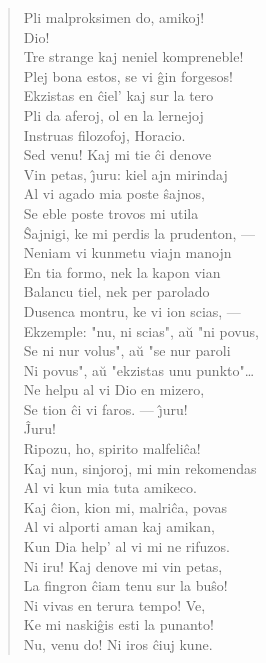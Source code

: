 \begin{verse}
                Pli malproksimen do, amikoj!\\
  Dio!\\
                Tre strange kaj neniel kompreneble!\\
 Plej bona estos, se vi \^gin forgesos!\\
                Ekzistas en \^ciel' kaj sur la tero\\
                Pli da aferoj, ol en la lernejoj\\
                Instruas filozofoj, Horacio.\\
                Sed venu! Kaj mi tie \^ci denove\\
                Vin petas, \^{\j}uru: kiel ajn mirindaj\\
                Al vi agado mia poste \^sajnos,\\
                Se eble poste trovos mi utila\\
                \^Sajnigi, ke mi perdis la prudenton, ---\\
                Neniam vi kunmetu viajn manojn\\
                En tia formo, nek la kapon vian\\
                Balancu tiel, nek per parolado\\
                Dusenca montru, ke vi ion scias, ---\\
                Ekzemple: "nu, ni scias", a\u u "ni povus,\\
                Se ni nur volus", a\u u "se nur paroli\\
                Ni povus", a\u u "ekzistas unu punkto"\dots\\
                Ne helpu al vi Dio en mizero,\\
                Se tion \^ci vi faros. --- \^{\j}uru!\\
 \^Juru!\\
 Ripozu, ho, spirito malfeli\^ca!\\
                Kaj nun, sinjoroj, mi min rekomendas\\
                Al vi kun mia tuta amikeco.\\
                Kaj \^cion, kion mi, malri\^ca, povas\\
                Al vi alporti aman kaj amikan,\\
                Kun Dia help' al vi mi ne rifuzos.\\
                Ni iru! Kaj denove mi vin petas,\\
                La fingron \^ciam tenu sur la bu\^so!\\
                Ni vivas en terura tempo! Ve,\\
                Ke mi naski\^gis esti la punanto!\\
                Nu, venu do! Ni iros ĉiuj kune.\\
\end{verse}
\smallrule{}
